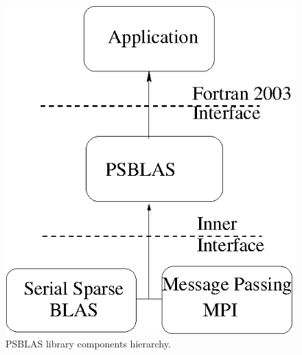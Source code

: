 \begin{figure}[h] 
\begin{center}
\ifcase\pdfoutput
\includegraphics[scale=0.65]{figures/psblas.eps}
\or
{}
\fi
\end{center}
\caption{PSBLAS library components hierarchy.\label{fig:psblas}}
\end{figure}


